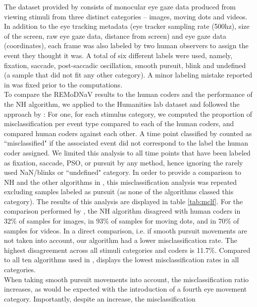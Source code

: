     The dataset provided by \cite{Andersson2017} consists of monocular eye gaze data produced from viewing stimuli from
    three distinct categories -- images, moving dots and videos. In addition to the eye tracking metadata (eye tracker
    sampling rate (500hz), size of the screen, raw eye gaze data, distance from screen) and eye gaze data (coordinates),
    each frame was also labeled by two human observers to assign the event they thought it was. A total of six different
    labels were used, namely, fixation, saccade, post-saccadic oscillation, smooth pursuit, blink and undefined (a sample
    that did not fit any other category). A minor labeling mistake reported in \cite{Zemblys2018} was fixed prior to the
    computations. \\
    To compare the REMoDNaV results to the human coders and the performance of the NH algorithm, we applied \remodnav to
    the Humanities lab dataset and followed the approach by \citet{Andersson2017}: For one, for each stimulus category,
    we computed the proportion of misclassification per event type compared to each of the human coders, and compared
    human coders against each other. A time point classified by \remodnav counted as ``misclassified" if the associated
    event did not correspond to the label the human coder assigned. We limited this analysis to all time points that
    have been labeled as fixation, saccade, PSO, or pursuit by any method, hence ignoring the rarely used NaN/blinks or
    ``undefined" category. In order to provide a comparison to NH and the other algorithms in \cite{Andersson2017}, this
    misclassification analysis was repeated excluding samples labeled as pursuit (as none of the algorithms classed this
    category). The results of this analysis are displayed in table \ref{tab:mclf}. For the comparison performed by
    \citet{Andersson2017}, the NH algorithm disagreed with human coders in 32\% of samples for images, in 93\% of samples
    for moving dots, and in 70\% of samples for videos. In a direct comparison, i.e. if smooth pursuit movements are
    not taken into account, our algorithm had a lower misclassification rate. The highest disagreement across all stimuli
    categories and coders is 11.7\%. Compared to all ten algorithms used in \citet{Andersson2017}, \remodnav displays
    the lowest misclassification rates in all categories.\\
    When taking smooth pursuit movements into account, the misclassification ratio increases, as would be expected
    with the introduction of a fourth eye movement category. Importantly, despite an increase, the misclassification
